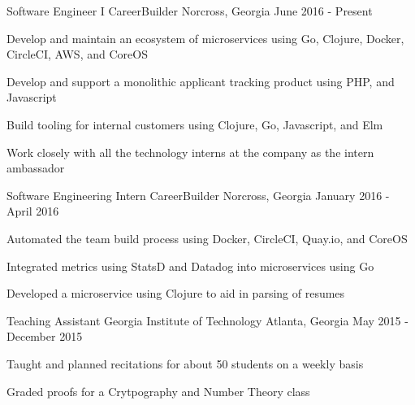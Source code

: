 

\begin{cventries}

  \cventry
    {Software Engineer I} %
    {CareerBuilder} %
    {Norcross, Georgia} %
    {June 2016 - Present} %
    {
      \begin{cvitems} %
        \item {Develop and maintain an ecosystem of microservices using Go, Clojure, Docker, CircleCI, AWS, and CoreOS}
        \item{Develop and support a monolithic applicant tracking product using PHP, and Javascript}
        \item{Build tooling for internal customers using Clojure, Go, Javascript, and Elm}
        \item {Work closely with all the technology interns at the company as the intern ambassador} 
      \end{cvitems} 
    }


  \cventry
    {Software Engineering Intern} %
    {CareerBuilder} %
    {Norcross, Georgia} %
    {January 2016 - April 2016} %
    {
      \begin{cvitems} %
        \item {Automated the team build process using Docker, CircleCI, Quay.io, and CoreOS}
        \item {Integrated metrics using StatsD and Datadog into microservices using Go}
        \item {Developed a microservice using Clojure to aid in parsing of resumes}
      \end{cvitems}
    }

  \cventry
    {Teaching Assistant} %
    {Georgia Institute of Technology} %
    {Atlanta, Georgia} %
    {May 2015 - December 2015} %
    {
      \begin{cvitems} %
        \item {Taught and planned recitations for about 50 students on a weekly basis}
        \item{Graded proofs for a Crytpography and Number Theory class}
      \end{cvitems}
    }


\end{cventries}
